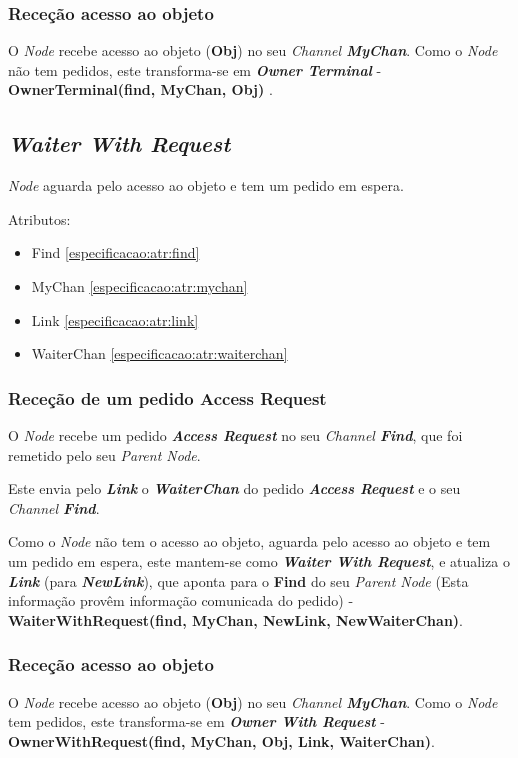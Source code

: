 \subsubsection{Receção acesso ao objeto}
O \emph{Node} recebe acesso ao objeto (\textbf{Obj}) no seu \emph{Channel \textbf{MyChan}}.
Como o \emph{Node} não tem pedidos, este transforma-se em \textbf{\emph{Owner Terminal}} - \textbf{ OwnerTerminal(find, MyChan, Obj) }.




\subsection{\emph{Waiter With Request}}
\label{especificacao:nodes:waiter_with_request}

\emph{Node} aguarda pelo acesso ao objeto e tem um pedido em espera.

Atributos:
\begin{itemize}
    \item Find \ref{especificacao:atr:find} 
    \item MyChan \ref{especificacao:atr:mychan} 
    \item Link \ref{especificacao:atr:link} 
    \item WaiterChan \ref{especificacao:atr:waiterchan} 
\end{itemize}



\subsubsection{Receção de um pedido Access Request}
O \emph{Node} recebe um pedido \emph{\textbf{Access Request}} no seu \emph{Channel \textbf{Find}}, que foi remetido pelo seu \emph{Parent Node}.

Este envia pelo \textbf{\emph{Link}} o \textbf{\emph{WaiterChan}} do pedido \emph{\textbf{Access Request}} e o seu \emph{Channel \textbf{Find}}.

Como o \emph{Node} não tem o acesso ao objeto, aguarda pelo acesso ao objeto e tem um pedido em espera, este mantem-se como \emph{\textbf{Waiter With Request}}, e atualiza o \textbf{\emph{Link}} (para \textbf{\emph{NewLink}}), que aponta para o \textbf{Find} do seu \emph{Parent Node} (Esta informação provêm informação comunicada do pedido) - \textbf{WaiterWithRequest(find, MyChan, NewLink, NewWaiterChan)}.


\subsubsection{Receção acesso ao objeto}
O \emph{Node} recebe acesso ao objeto (\textbf{Obj}) no seu \emph{Channel \textbf{MyChan}}.
Como o \emph{Node} tem pedidos, este transforma-se em \textbf{\emph{Owner With Request}} - \textbf{OwnerWithRequest(find, MyChan, Obj, Link, WaiterChan)}.



